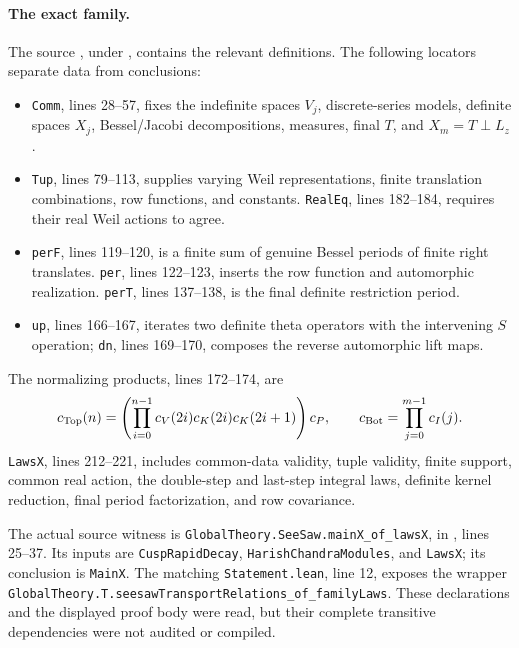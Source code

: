 \documentclass[11pt]{article}
\theoremstyle{definition}\newtheorem{definition}[theorem]{Definition}\newtheorem{remark}[theorem]{Remark}
\begin{document}
\paragraph{The exact family.}
The source , under
, contains the relevant definitions. The following locators separate data from conclusions:
\begin{itemize}
\item \texttt{Comm}, lines 28--57, fixes the indefinite spaces $V_j$, discrete-series models, definite spaces $X_j$, Bessel/Jacobi decompositions, measures, final $T$, and $X_m=T\perp L_z$.
\item \texttt{Tup}, lines 79--113, supplies varying Weil representations, finite translation combinations, row functions, and constants. \texttt{RealEq}, lines 182--184, requires their real Weil actions to agree.
\item \texttt{perF}, lines 119--120, is a finite sum of genuine Bessel periods of finite right translates. \texttt{per}, lines 122--123, inserts the row function and automorphic realization. \texttt{perT}, lines 137--138, is the final definite restriction period.
\item \texttt{up}, lines 166--167, iterates two definite theta operators with the intervening $S$ operation; \texttt{dn}, lines 169--170, composes the reverse automorphic lift maps.
\end{itemize}
The normalizing products, lines 172--174, are
\[
 c_{\rm Top}(n)=
 \left(\prod_{i=0}^{n-1}c_V(2i)c_K(2i)c_K(2i+1)\right)c_P,
 \qquad
 c_{\rm Bot}=\prod_{j=0}^{m-1}c_I(j).
\]
\texttt{LawsX}, lines 212--221, includes common-data validity, tuple validity, finite support, common real action, the double-step and last-step integral laws, definite kernel reduction, final period factorization, and row covariance.

The actual source witness is
\nolinkurl{GlobalTheory.SeeSaw.mainX_of_lawsX}, in
, lines 25--37. Its inputs are \texttt{CuspRapidDecay}, \texttt{HarishChandraModules}, and \texttt{LawsX}; its conclusion is \texttt{MainX}. The matching \texttt{Statement.lean}, line 12, exposes the wrapper
\nolinkurl{GlobalTheory.T.seesawTransportRelations_of_familyLaws}.
These declarations and the displayed proof body were read, but their complete transitive dependencies were not audited or compiled.
\end{document}
